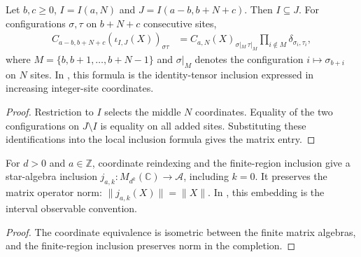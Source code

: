 \begin{lemma}
    \label{thm:local_interval_coordinate_inclusion}
    \leanok
    Let $b,c\geq0$, $I=I(a,N)$ and $J=I(a-b,b+N+c)$. Then $I\subseteq J$.
    For configurations $\sigma,\tau$ on $b+N+c$ consecutive sites,
    \begin{align}
        C_{a-b,b+N+c}(\iota_{I,J}(X))_{\sigma\tau}
         & =C_{a,N}(X)_{\sigma|_M\,\tau|_M}
        \prod_{i\notin M}\delta_{\sigma_i,\tau_i},
    \end{align}
    where $M=\{b,b+1,\ldots,b+N-1\}$ and $\sigma|_M$ denotes the
    configuration $i\mapsto\sigma_{b+i}$ on $N$ sites.
    In \cite[Appendix]{Cirac2017MPU}, this formula is the identity-tensor inclusion
    expressed in increasing integer-site coordinates.
\end{lemma}
\begin{proof}\leanok
    Restriction to $I$ selects the middle $N$ coordinates. Equality of the
    two configurations on $J\setminus I$ is equality on all added sites.
    Substituting these identifications into the local inclusion formula gives the matrix entry.
\end{proof}

\begin{theorem}
    \label{thm:quasi_local_interval_observable}
    \leanok
    For $d>0$ and $a\in\mathbb Z$, coordinate reindexing and the finite-region
    inclusion give a star-algebra inclusion
    $j_{a,k}:M_{d^k}(\mathbb C)\to\mathcal A$, including $k=0$.
    It preserves the matrix operator norm: $\|j_{a,k}(X)\|=\|X\|$.
    In \cite[Section~3]{Nachtergaele1996Spectral}, this embedding is the interval observable
    convention.
\end{theorem}
\begin{proof}\leanok
    The coordinate equivalence is isometric between the finite matrix
    algebras, and the finite-region inclusion preserves norm in the completion.
\end{proof}

